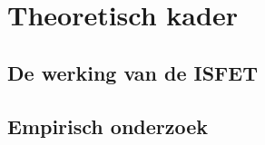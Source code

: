 \section{Theoretisch kader}

\subsection{De werking van de ISFET}\label{sec:werkingISFET}


\subsection{Empirisch onderzoek}



